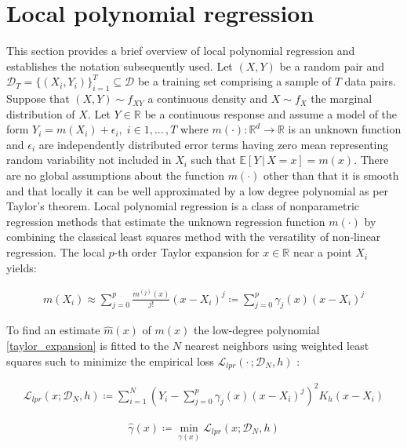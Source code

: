 \documentclass[preprint,1p,times]{elsarticle}
\begin{document}
\section{Local polynomial regression}
\label{S:Local polynomial regression}
This section provides a brief overview of local polynomial regression and establishes the notation subsequently used. Let $( X, Y )$ be a random pair and $\mathcal{D}_T = \{(X_i,Y_i)\}_{i=1}^{T} \subseteq \mathcal{D}$ be a training set comprising a sample of $T$ data pairs. Suppose that $(X , Y) \sim f_{XY}$ a continuous density and $X \sim f_X$ the marginal distribution of $X$. Let $Y \in \mathbb{R}$ be a continuous response and assume a model of the form $Y_i=m(X_i) + \epsilon_i, \; i \in 1,... \, ,T$ where $m(\cdot): \mathbb{R}^d \rightarrow \mathbb{R }$ is an unknown function and $\epsilon_i$ are independently distributed error terms having zero mean representing random variability not included in $X_i$ such that $\mathbb{E}[Y \, | \,X=x] = m(x)$. There are no global assumptions about the function $m(\cdot)$ other than that it is smooth and that locally it can be well approximated by a low degree polynomial as per Taylor’s theorem. Local polynomial regression is a class of nonparametric regression methods that estimate the unknown regression function $m(\cdot)$ by combining the classical least squares method with the versatility of non-linear regression. The local $p$-th order Taylor expansion for $x \in \mathbb{R}$ near a point $X_i$ yields:

\begin{align}
m(X_i) \approx \sum_{j=0}^p \frac{m^{(j)}(x)}{j!} (x - X_i)^j \coloneqq \sum_{j=0}^p \gamma_j(x)(x - X_i)^j
\label{taylor_expansion}
\end{align}

To find an estimate $\hat{m}(x)$ of $m(x)$ the low-degree polynomial \eqref{taylor_expansion} is fitted to the $N$ nearest neighbors using weighted least squares such to minimize the empirical loss $\mathcal{L}_{lpr}( \cdot \, ; \mathcal{D}_N , h)$ :

\begin{align}
\mathcal{L}_{lpr}(x; \mathcal{D}_N , h) \coloneqq \sum_{i=1}^N \left(  Y_i - \sum_{j=0}^p \gamma_j (x) (x - X_i)^j \right)^2 K_h(x - X_i)
\label{loss_lpr}
\end{align}


\begin{align}
\hat{\gamma}(x) \coloneqq \min_{\gamma(x)} \mathcal{L}_{lpr}(x; \mathcal{D}_N,h)
\label{beta_hat}
\end{align}
\end{document}
